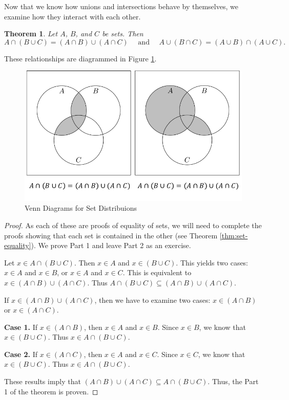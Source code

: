 \documentclass[
]{book}
\newtheorem{theorem}{Theorem}[chapter]
\theoremstyle{definition}
\theoremstyle{definition}
\theoremstyle{definition}
\theoremstyle{remark}
\begin{document}
Now that we know how unions and intersections behave by themselves, we examine how they interact with each other.

\begin{theorem}
\protect\hypertarget{thm:set-distribution}{}{\label{thm:set-distribution} }Let \(A\), \(B\), and \(C\) be sets. Then
\[ A \cap (B \cup C) = (A \cap B) \cup (A \cap C) \quad \mbox{ and } \quad  A \cup (B \cap C) = (A \cup B) \cap (A \cup C).\]
\end{theorem}

These relationships are diagrammed in Figure \ref{fig:set-distributions}.

\begin{figure}

{\centering \includegraphics[width=0.8\linewidth]{tikz/set-distribution} 

}

\caption{Venn Diagrams for Set Distribuions }\label{fig:set-distributions}
\end{figure}

\begin{proof}
{} As each of these are proofs of equality of sets, we will need to complete the proofs showing that each set is contained in the other (see Theorem \ref{thm:set-equality}). We prove Part 1 and leave Part 2 as an exercise.

Let \(x\in A \cap (B \cup C)\). Then \(x\in A\) and \(x\in (B\cup C)\). This yields two cases: \(x\in A\) and \(x\in B\), or \(x\in A\) and \(x\in C\). This is equivalent to \(x \in (A\cap B) \cup (A\cap C)\). Thus \(A \cap (B \cup C) \subseteq (A \cap B) \cup (A \cap C)\).

If \(x\in (A \cap B) \cup (A \cap C)\), then we have to examine two cases: \(x\in (A\cap B)\) or \(x\in (A \cap C)\).

\textbf{Case 1.} If \(x\in (A\cap B)\), then \(x\in A\) and \(x\in B\). Since \(x\in B\), we know that \(x\in (B\cup C)\). Thus \(x\in A \cap (B\cup C)\).

\textbf{Case 2.} If \(x \in (A\cap C)\), then \(x\in A\) and \(x\in C\). Since \(x\in C\), we know that \(x \in (B\cup C)\). Thus \(x \in A \cap (B\cup C)\).

These results imply that \((A \cap B) \cup (A \cap C) \subseteq A \cap (B \cup C)\). Thus, the Part 1 of the theorem is proven.
\end{proof}
\end{document}
